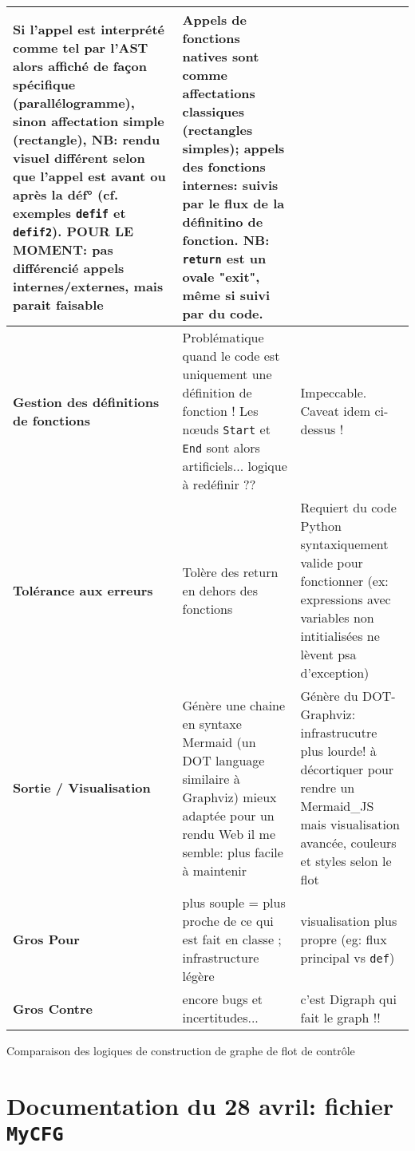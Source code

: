 \documentclass[11pt,a4paper]{article}
\begin{document}
\begin{longtable}{|p{3cm}|p{7cm}|p{6cm}|}
Si l'appel est interprété comme tel par l'AST alors affiché de façon spécifique (parallélogramme), sinon affectation simple (rectangle), NB: rendu visuel différent selon que l'appel est avant ou après la déf° (cf. exemples \texttt{defif} et \texttt{defif2}). POUR LE MOMENT: pas différencié appels internes/externes, mais parait faisable & 
Appels de fonctions natives sont comme affectations classiques (rectangles simples); appels des fonctions internes: suivis par le flux de la définitino de fonction. NB: \texttt{return} est un ovale "exit", même si suivi par du code. \\
\hline
\textbf{Gestion des définitions de fonctions} & 
Problématique quand le code est uniquement une définition de fonction ! Les nœuds \texttt{Start} et \texttt{End} sont alors artificiels... logique à redéfinir ??  & 
Impeccable. Caveat idem ci-dessus ! \\
\hline
\textbf{Tolérance aux erreurs} & 
Tolère des return en dehors des fonctions & 
Requiert du code Python syntaxiquement valide pour fonctionner (ex: expressions avec variables non intitialisées ne lèvent psa d'exception) \\
\hline
\textbf{Sortie / Visualisation} & 
Génère une chaine en syntaxe Mermaid (un DOT language similaire à Graphviz) mieux adaptée pour un rendu Web il me semble: plus facile à maintenir & 
Génère du DOT-Graphviz: infrastrucutre plus lourde! à décortiquer pour rendre un Mermaid_{JS} mais visualisation avancée, couleurs et styles selon le flot \\
\hline
\textbf{Gros Pour} & 
plus souple = plus proche de ce qui est fait en classe ; infrastructure légère & 
visualisation plus propre (eg: flux principal vs \texttt{def})  \\
\hline
\textbf{Gros Contre} & 
encore bugs et incertitudes... & 
c'est Digraph qui fait le graph !! \\
\hline

\end{longtable}

\caption{Comparaison des logiques de construction de graphe de flot de contrôle}


\section{Documentation du 28 avril: fichier \texttt{MyCFG} }
\end{document}
